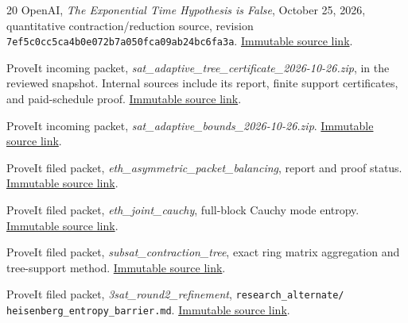\begin{thebibliography}{20}
\small
{} OpenAI, \emph{The Exponential Time Hypothesis is False},
October 25, 2026, quantitative contraction/reduction source, revision
\texttt{7ef5c0cc5ca4b0e072b7a050fca09ab24bc6fa3a}.
\href{https://github.com/openai/math/tree/7ef5c0cc5ca4b0e072b7a050fca09ab24bc6fa3a/preprints/The-Exponential-Time-Hypothesis-is-False-October-25-2026}{Immutable source link}.

 ProveIt incoming packet,
\emph{sat\_adaptive\_tree\_certificate\_2026-10-26.zip},
in the reviewed snapshot. Internal sources include its report,
finite support certificates, and paid-schedule proof.
\href{https://github.com/VladimirReshetnikov/ProveIt/blob/73dfb5e5ab6e91bd7375e5b97ef85d7e1cc8e81d/docs/incoming/sat_adaptive_tree_certificate_2026-10-26.zip}{Immutable source link}.

 ProveIt incoming packet,
\emph{sat\_adaptive\_bounds\_2026-10-26.zip}.
\href{https://github.com/VladimirReshetnikov/ProveIt/blob/73dfb5e5ab6e91bd7375e5b97ef85d7e1cc8e81d/docs/incoming/sat_adaptive_bounds_2026-10-26.zip}{Immutable source link}.

 ProveIt filed packet,
\emph{eth\_asymmetric\_packet\_balancing}, report and proof status.
\href{https://github.com/VladimirReshetnikov/ProveIt/tree/73dfb5e5ab6e91bd7375e5b97ef85d7e1cc8e81d/Computability/SubexponentialSAT/Research/eth_asymmetric_packet_balancing}{Immutable source link}.

 ProveIt filed packet,
\emph{eth\_joint\_cauchy}, full-block Cauchy mode entropy.
\href{https://github.com/VladimirReshetnikov/ProveIt/tree/73dfb5e5ab6e91bd7375e5b97ef85d7e1cc8e81d/Computability/SubexponentialSAT/Research/eth_joint_cauchy}{Immutable source link}.

 ProveIt filed packet,
\emph{subsat\_contraction\_tree}, exact ring matrix aggregation and
tree-support method.
\href{https://github.com/VladimirReshetnikov/ProveIt/tree/73dfb5e5ab6e91bd7375e5b97ef85d7e1cc8e81d/Computability/SubexponentialSAT/Research/subsat_contraction_tree}{Immutable source link}.

 ProveIt filed packet,
\emph{3sat\_round2\_refinement},
\texttt{research\_alternate/}\allowbreak
\texttt{heisenberg\_entropy\_barrier.md}.
\href{https://github.com/VladimirReshetnikov/ProveIt/blob/73dfb5e5ab6e91bd7375e5b97ef85d7e1cc8e81d/Computability/SubexponentialSAT/Research/3sat_round2_refinement/research_alternate/heisenberg_entropy_barrier.md}{Immutable source link}.


\end{thebibliography}
